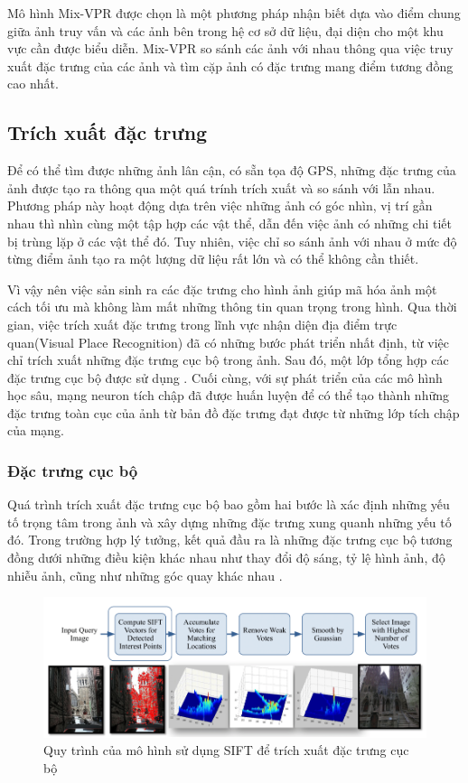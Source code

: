 Mô hình Mix-VPR được chọn là một phương pháp nhận biết dựa vào điểm chung giữa ảnh truy vấn và các ảnh bên trong hệ cơ sở dữ liệu, đại diện cho một khu vực cần được biểu diễn. Mix-VPR so sánh các ảnh với nhau thông qua việc truy xuất đặc trưng của các ảnh và tìm cặp ảnh có đặc trưng mang điểm tương đồng cao nhất.

\subsection{Trích xuất đặc trưng}
Để có thể tìm được những ảnh lân cận, có sẵn tọa độ GPS, những đặc trưng của ảnh được tạo ra thông qua một quá trính trích xuất và so sánh với lẫn nhau. Phương pháp này hoạt động dựa trên việc những ảnh có góc nhìn, vị trí gần nhau thì nhìn cùng một tập hợp các vật thể, dẫn đến việc ảnh có những chi tiết bị trùng lặp ở các vật thể đó. Tuy nhiên, việc chỉ so sánh ảnh với nhau ở mức độ từng điểm ảnh tạo ra một lượng dữ liệu rất lớn và có thể không cần thiết.

Vì vậy nên việc sản sinh ra các đặc trưng cho hình ảnh giúp mã hóa ảnh một cách tối ưu mà không làm mất những thông tin quan trọng trong hình. Qua thời gian, việc trích xuất đặc trưng trong lĩnh vực nhận diện địa điểm trực quan(Visual Place Recognition) đã có những bước phát triển nhất định, từ việc chỉ trích xuất những đặc trưng cục bộ trong ảnh. Sau đó, một lớp tổng hợp các đặc trưng cục bộ được sử dụng \cite{pion2020benchmarking}. Cuối cùng, với sự phát triển của các mô hình học sâu, mạng neuron tích chập đã được huấn luyện để có thể tạo thành những đặc trưng toàn cục của ảnh từ bản đồ đặc trưng đạt được từ những lớp tích chập của mạng.
\subsubsection*{Đặc trưng cục bộ}
Quá trình trích xuất đặc trưng cục bộ bao gồm hai bước là xác định những yếu tố trọng tâm trong ảnh và xây dựng những đặc trưng xung quanh những yếu tố đó. Trong trường hợp lý tưởng, kết quả đầu ra là những đặc trưng cục bộ tương đồng dưới những điều kiện khác nhau như thay đổi độ sáng, tỷ lệ hình ảnh, độ nhiễu ảnh, cũng như những góc quay khác nhau \cite{lowe1999object}.

\begin{figure}[H]
    \centering
    \includegraphics[scale=0.5]{pics/Chapter3/SIFT.png}
    \caption{Quy trình của mô hình sử dụng SIFT để trích xuất đặc trưng cục bộ \cite{zamir2010accurate}}
    \label{fig:enter-label}
\end{figure}

